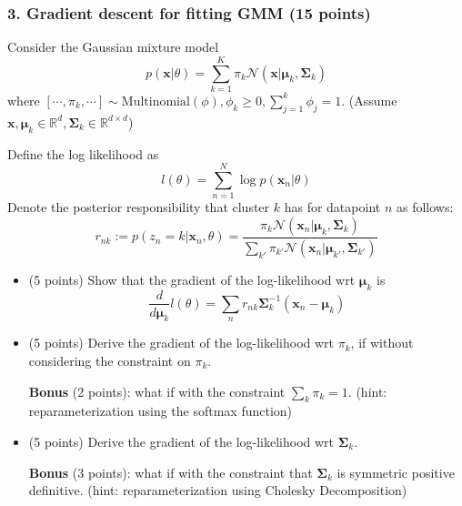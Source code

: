 \documentclass[12pt]{article}%
\begin{document}
\newpage


\subsubsection*{3. Gradient descent for fitting GMM (15 points)}
Consider the Gaussian mixture model
\[p(\mathbf{x}|\theta)=\sum_{k=1}^K \pi_k \mathcal{N}(\mathbf{x}|\mathbf{\mu}_k,\mathbf{\Sigma}_k)\]
where $[\cdots,\pi_k,\cdots]\sim \text{Multinomial}(\phi), \phi_k\geq 0, \sum_{j=1}^k\phi_j = 1$. (Assume $\mathbf{x},\mathbf{\mu}_k\in \mathbb{R}^d,\mathbf{\Sigma}_k\in \mathbb{R}^{d\times d}$)

Define the log likelihood as
\[ l(\theta) = \sum_{n=1}^N \log p(\mathbf{x}_n|\theta)
\]
Denote the posterior responsibility that cluster $k$ has for datapoint $n$ as follows:
\[
r_{nk}:=p(z_n=k|\mathbf{x}_n,\theta) = \frac{\pi_k\mathcal{N}(\mathbf{x}_n|\mathbf{\mu}_k,\mathbf{\Sigma}_k)}{\sum_{k'}\pi_{k'}\mathcal{N}(\mathbf{x}_n|\mathbf{\mu}_{k'},\mathbf{\Sigma}_{k'})}
\]

\begin{itemize}
	
	\item (5 points) Show that the gradient of the log-likelihood wrt $\mathbf{\mu}_k$ is
	\[ \frac{d}{d\mathbf{\mu}_k}l(\theta) = \sum_n r_{nk}\mathbf{\Sigma}_k^{-1}(\mathbf{x}_n-\mathbf{\mu}_k)
	\]
	\item (5 points) Derive the gradient of the log-likelihood wrt $\pi_k$, if without considering the constraint on $\pi_k$. 
	
	\textbf{Bonus} (2 points): what if with the constraint $\sum_k\pi_k=1$. (hint: reparameterization using the softmax function)
	\item (5 points) Derive the gradient of the log-likelihood wrt $\mathbf{\Sigma}_k$.
	
	\textbf{Bonus} (3 points): what if with the constraint that $\mathbf{\Sigma}_k$ is symmetric positive definitive. (hint: reparameterization using Cholesky Decomposition)
	
\end{itemize}
\end{document}
